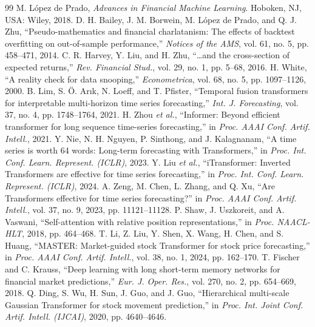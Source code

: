 \begin{thebibliography}{99}
\setlength{\itemsep}{0pt}
 M. L\'opez de Prado, \textit{Advances in Financial Machine Learning}. Hoboken, NJ, USA: Wiley, 2018.
 D. H. Bailey, J. M. Borwein, M. L\'opez de Prado, and Q. J. Zhu, ``Pseudo-mathematics and financial charlatanism: The effects of backtest overfitting on out-of-sample performance,'' \textit{Notices of the AMS}, vol. 61, no. 5, pp. 458--471, 2014.
 C. R. Harvey, Y. Liu, and H. Zhu, ``\ldots and the cross-section of expected returns,'' \textit{Rev. Financial Stud.}, vol. 29, no. 1, pp. 5--68, 2016.
 H. White, ``A reality check for data snooping,'' \textit{Econometrica}, vol. 68, no. 5, pp. 1097--1126, 2000.
 B. Lim, S. \"O. Ar{\i}k, N. Loeff, and T. Pfister, ``Temporal fusion transformers for interpretable multi-horizon time series forecasting,'' \textit{Int. J. Forecasting}, vol. 37, no. 4, pp. 1748--1764, 2021.
 H. Zhou \textit{et al.}, ``Informer: Beyond efficient transformer for long sequence time-series forecasting,'' in \textit{Proc. AAAI Conf. Artif. Intell.}, 2021.
 Y. Nie, N. H. Nguyen, P. Sinthong, and J. Kalagnanam, ``A time series is worth 64 words: Long-term forecasting with Transformers,'' in \textit{Proc. Int. Conf. Learn. Represent. (ICLR)}, 2023.
 Y. Liu \textit{et al.}, ``iTransformer: Inverted Transformers are effective for time series forecasting,'' in \textit{Proc. Int. Conf. Learn. Represent. (ICLR)}, 2024.
 A. Zeng, M. Chen, L. Zhang, and Q. Xu, ``Are Transformers effective for time series forecasting?'' in \textit{Proc. AAAI Conf. Artif. Intell.}, vol. 37, no. 9, 2023, pp. 11121--11128.
 P. Shaw, J. Uszkoreit, and A. Vaswani, ``Self-attention with relative position representations,'' in \textit{Proc. NAACL-HLT}, 2018, pp. 464--468.
 T. Li, Z. Liu, Y. Shen, X. Wang, H. Chen, and S. Huang, ``MASTER: Market-guided stock Transformer for stock price forecasting,'' in \textit{Proc. AAAI Conf. Artif. Intell.}, vol. 38, no. 1, 2024, pp. 162--170.
 T. Fischer and C. Krauss, ``Deep learning with long short-term memory networks for financial market predictions,'' \textit{Eur. J. Oper. Res.}, vol. 270, no. 2, pp. 654--669, 2018.
 Q. Ding, S. Wu, H. Sun, J. Guo, and J. Guo, ``Hierarchical multi-scale Gaussian Transformer for stock movement prediction,'' in \textit{Proc. Int. Joint Conf. Artif. Intell. (IJCAI)}, 2020, pp. 4640--4646.

\end{thebibliography}
